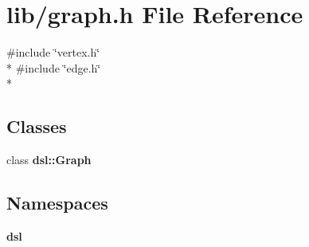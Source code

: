 \section{lib/graph.h File Reference}
\label{lib_2graph_8h}
{\ttfamily \#include \char`\"{}vertex.\-h\char`\"{}}\\*
{\ttfamily \#include \char`\"{}edge.\-h\char`\"{}}\\*
\subsection*{Classes}
\begin{DoxyCompactItemize}
\item 
class {\bf dsl\-::\-Graph}
\end{DoxyCompactItemize}
\subsection*{Namespaces}
\begin{DoxyCompactItemize}
\item 
{\bf dsl}
\end{DoxyCompactItemize}
